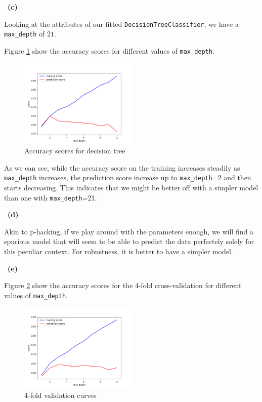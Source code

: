 \documentclass[a4 paper, 15pt]{article}
\numberwithin{equation}{section}
\newcommand{\subproblem}[1]{~\newline\textbf{(#1)}}
\begin{document}
\subproblem{c}

Looking at the attributes of our fitted \texttt{DecisionTreeClassifier}, we have a \texttt{max\_depth} of $21$.

Figure \ref{fig:1} show the accuracy scores for different values of \texttt{max\_depth}.

\begin{figure}[H]
  \centering
  \includegraphics[width=0.5\textwidth]{fig_1}
  \caption{Accuracy scores for decision tree\label{fig:1}}
\end{figure}

As we can see, while the accuracy score on the training increases steadily as \texttt{max\_depth} increases, the prediction score increase up to \texttt{max\_depth}=2 and then starts decreasing. This indicates that we might be better off with a simpler model than one with \texttt{max\_depth}=21.


\subproblem{d}

Akin to p-hacking, if we play around with the parameters enough, we will find a spurious model that will seem to be able to predict the data perfectely solely for this peculiar context. For robustness, it is better to have a simpler model.

\subproblem{e}

Figure \ref{fig:2} show the accuracy scores for the 4-fold cross-validation for different values of \texttt{max\_depth}.

\begin{figure}[H]
  \centering
\includegraphics[width=0.5\textwidth]{fig_2}
  \caption{4-fold validation curves\label{fig:2}}
\end{figure}
\end{document}
